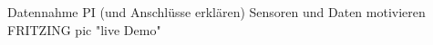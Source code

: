 \begin{frame}[t]{Datennahme}
	PI (und Anschlüsse erklären)
	Sensoren und Daten motivieren
	FRITZING pic
	"live Demo"
\end{frame}
